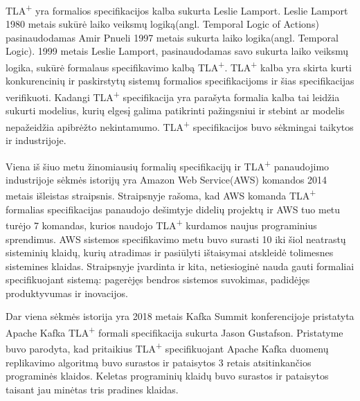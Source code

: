 \documentclass{VUMIFPSmagistrinis}
\begin{document}
		TLA\textsuperscript{+} yra formalios specifikacijos kalba sukurta Leslie Lamport.
		Leslie Lamport 1980 metais sukūrė laiko veiksmų logiką(angl. Temporal Logic of Actions) pasinaudodamas Amir Pnueli 1997 metais sukurta laiko logika(angl. Temporal Logic).
		1999 metais Leslie Lamport, pasinaudodamas savo sukurta laiko veiksmų logika, sukūrė formalaus specifikavimo kalbą TLA\textsuperscript{+}.
		TLA\textsuperscript{+} kalba yra skirta kurti konkurencinių ir paskirstytų sistemų formalios specifikacijoms ir šias specifikacijas verifikuoti.
		Kadangi TLA\textsuperscript{+} specifikacija yra parašyta formalia kalba tai leidžia sukurti modelius, kurių elgesį galima patikrinti pažingsniui ir stebint ar modelis nepažeidžia apibrėžto nekintamumo.
		TLA\textsuperscript{+} specifikacijos buvo sėkmingai taikytos ir industrijoje.


		Viena iš šiuo metu žinomiausių formalių specifikacijų ir TLA\textsuperscript{+} panaudojimo industrijoje sėkmės istorijų yra Amazon Web Service(AWS) komandos 2014 metais išleistas straipsnis.
		Straipsnyje rašoma,  kad AWS komanda TLA\textsuperscript{+} formalias specifikacijas panaudojo dešimtyje didelių projektų ir AWS tuo metu turėjo 7 komandas, kurios naudojo TLA\textsuperscript{+} kurdamos naujus programinius sprendimus.
		AWS sistemos specifikavimo metu buvo surasti 10 iki šiol neatrastų sisteminių klaidų, kurių atradimas ir pasiūlyti ištaisymai atskleidė tolimesnes sistemines klaidas.
		Straipsnyje įvardinta ir kita, netiesioginė nauda gauti formaliai specifikuojant sistemą: pagerėjęs bendros sistemos suvokimas, padidėjęs produktyvumas ir inovacijos.
		

		Dar viena sėkmės istorija yra 2018 metais Kafka Summit konferencijoje pristatyta Apache Kafka TLA\textsuperscript{+} formali specifikacija sukurta Jason Gustafson.
		Pristatyme buvo parodyta, kad pritaikius TLA\textsuperscript{+} specifikuojant Apache Kafka duomenų replikavimo algoritmą buvo surastos ir pataisytos 3 retais atsitinkančios programinės klaidos.
		Keletas programinių klaidų buvo surastos ir pataisytos taisant jau minėtas tris pradines klaidas.
\end{document}
